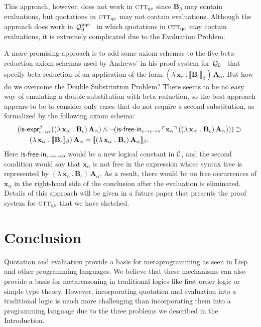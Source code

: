 \documentclass[fleqn]{llncs}
\newcommand{\sC}{\mbox{$\cal C$}}
\newcommand{\churchqe}{$\mbox{\sc ctt}_{\rm qe}$}
\newcommand{\qzero}{${\cal Q}_0$}
\newcommand{\qzerouqe}{${\cal Q}^{\rm uqe}_{0}$}
\newcommand{\sembrack}[1]{\llbracket#1\rrbracket}
\newcommand{\synbrack}[1]{\ulcorner#1\urcorner}
\newcommand{\mname}[1]{\mbox{\sf #1}}
\newcommand{\mdot}{\mathrel.}
\newcommand{\tarrow}{\rightarrow}
\newcommand{\LambdaApp}{\lambda\,}
\newcommand{\Neg}{\neg}
\newcommand{\Andd}{\wedge}
\newcommand{\Implies}{\supset}
\begin{document}
This approach, however, does not work in {\churchqe} since
$\textbf{B}_\beta$ may contain evaluations, but quotations in
{\churchqe} may not contain evaluations.  Although the approach does
work in {\qzerouqe}~\cite{FarmerArxiv14} in which quotations in
{\churchqe} may contain evaluations, it is extremely complicated due
to the Evaluation Problem.

A more promising approach is to add some axiom schemas to the five
beta-reduction axiom schemas used by Andrews' in his proof system for
{\qzero}~\cite[p.~213]{Andrews02} that specify beta-reduction of an
application of the form $(\LambdaApp \textbf{x}_\alpha \mdot
\sembrack{\textbf{B}_\epsilon}_\beta) \, \textbf{A}_\alpha$.  But how
do we overcome the Double Substitution Problem?  There seems to be no
easy way of emulating a double substitution with beta-reduction, so
the best approach appears to be to consider only cases that do not
require a second substitution, as formalized by the following axiom
schema:
\begin{align*}
&
(\mname{is-expr}_{\epsilon \tarrow o}^{\beta} \, 
((\LambdaApp \textbf{x}_\alpha \mdot \textbf{B}_\epsilon) \, \textbf{A}_\alpha) \Andd 
\Neg(\mname{is-free-in}_{\epsilon \tarrow \epsilon \tarrow o} \,
\synbrack{\textbf{x}_\alpha} \, ((\LambdaApp \textbf{x}_\alpha \mdot
\textbf{B}_\epsilon) \, \textbf{A}_\alpha))) \Implies {} \\
&
\hspace{4ex}
(\LambdaApp \textbf{x}_\alpha \mdot
\sembrack{\textbf{B}_\epsilon}_\beta) \, \textbf{A}_\alpha =
\sembrack{(\LambdaApp \textbf{x}_\alpha \mdot \textbf{B}_\epsilon) \,
  \textbf{A}_\alpha}_\beta.
\end{align*}
Here $\mname{is-free-in}_{\epsilon \tarrow \epsilon \tarrow o}$ would
be a new logical constant in $\sC$, and the second condition would say
that $\textbf{x}_\alpha$ is not free in the expression whose syntax
tree is represented by $(\LambdaApp \textbf{x}_\alpha \mdot
\textbf{B}_\epsilon) \, \textbf{A}_\alpha$.  As a result, there would
be no free occurrences of $\textbf{x}_\alpha$ in the right-hand side
of the conclusion after the evaluation is eliminated.  Details of this
approach will be given in a future paper that presents the proof
system for {\churchqe} that we have sketched.

\section{Conclusion}

Quotation and evaluation provide a basis for metaprogramming as seen
in Lisp and other programming languages.  We believe that these
mechanisms can also provide a basis for metareasoning in traditional
logics like first-order logic or simple type theory.  However,
incorporating quotation and evaluation into a traditional logic is
much more challenging than incorporating them into a programming
language due to the three problems we described in the Introduction.
\end{document}
